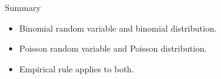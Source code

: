 \documentclass{beamer}
\newcommand{\ignore}[1]{}
\let\thefootnote\relax\footnotetext{\tiny{*  Office Hours: Wed \& Fri 10:00 - 11:30 AM, KMC 8-174}}
\begin{document}
\begin{frame}{Summary}
\begin{itemize}
\item Binomial random variable and binomial distribution.
\item Poisson random variable and Poisson distribution.
\item Empirical rule applies to both.
\end{itemize}

\end{frame}
\ignore{
\begin{frame}{Time Series Plot}
\begin{figure}
    \caption{}
    \texttt{[image: figures/coindesk-bpi-chart]}
\end{figure}
\let\thefootnote\relax\footnotetext{\tiny{* Plot from Coindesk.com}}
\end{frame}

\begin{frame}{}
\begin{itemize}
\item 
\end{itemize}
\end{frame}

\vspace{\stretch{0.5}}

\begin{block}{}
\end{block}


}
\end{document}
